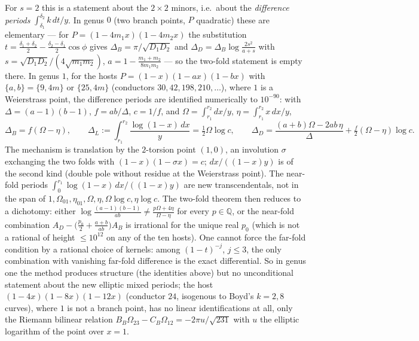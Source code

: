 \documentclass[11pt]{amsart}
\theoremstyle{remark}
\newcommand{\Q}{\mathbb Q}\newcommand{\Z}{\mathbb Z}\newcommand{\R}{\mathbb R}\newcommand{\C}{\mathbb C}
\begin{document}
For $s=2$ this is a statement about the $2\times2$ minors, i.e.\ about the \emph{difference periods} $\int_{\delta_1}^{\delta_2}k\,dt/y$. In genus $0$ (two branch points, $P$ quadratic) these are elementary — for $P=(1-4m_1x)(1-4m_2x)$ the substitution $t=\frac{\delta_1+\delta_2}2-\frac{\delta_2-\delta_1}2\cos\phi$ gives $\Delta_B=\pi/\sqrt{D_1D_2}$ and $\Delta_D=\Delta_B\log\frac{2s^2}{a+s}$ with $s=\sqrt{D_1D_2}/(4\sqrt{m_1m_2})$, $a=1-\frac{m_1+m_2}{8m_1m_2}$ — so the two-fold statement is empty there. In genus $1$, for the hosts $P=(1-x)(1-ax)(1-bx)$ with $\{a,b\}=\{9,4m\}$ or $\{25,4m\}$ (conductors $30,42,198,210,\dots$), where $1$ is a Weierstrass point, the difference periods are identified numerically to $10^{-90}$: with $\Delta=(a-1)(b-1)$, $f=ab/\Delta$, $c=1/f$, and $\Omega=\int_{r_1}^{r_2}dx/y$, $\eta=\int_{r_1}^{r_2}x\,dx/y$,
\[
\Delta_B=f(\Omega-\eta),\qquad \Delta_L:=\int_{r_1}^{r_2}\frac{\log(1-x)\,dx}y=\tfrac12\Omega\log c,\qquad \Delta_D=\frac{(a+b)\Omega-2ab\,\eta}\Delta+\tfrac f2(\Omega-\eta)\log c .
\]
The mechanism is translation by the $2$-torsion point $(1,0)$, an involution $\sigma$ exchanging the two folds with $(1-x)(1-\sigma x)=c$; $dx/((1-x)y)$ is of the second kind (double pole without residue at the Weierstrass point). The near-fold periods $\int_0^{r_1}\log(1-x)\,dx/((1-x)y)$ are new transcendentals, not in the span of $1,\Omega_{01},\eta_{01},\Omega,\eta,\Omega\log c,\eta\log c$. The two-fold theorem then reduces to a dichotomy: either $\log\frac{(a-1)(b-1)}{ab}\ne\frac{p\Omega+4\eta}{\Omega-\eta}$ for every $p\in\Q$, or the near-fold combination $A_D-\bigl(\frac{p_0}2+\frac{a+b}{ab}\bigr)A_B$ is irrational for the unique real $p_0$ (which is not a rational of height $\le10^{12}$ on any of the ten hosts). One cannot force the far-fold condition by a rational choice of kernels: among $(1-t)^{-j}$, $j\le3$, the only combination with vanishing far-fold difference is the exact differential. So in genus one the method produces structure (the identities above) but no unconditional statement about the new elliptic mixed periods; the host $(1-4x)(1-8x)(1-12x)$ (conductor $24$, isogenous to Boyd's $k=2,8$ curves), where $1$ is not a branch point, has no linear identifications at all, only the Riemann bilinear relation $B_B\Omega_{23}-C_B\Omega_{12}=-2\pi u/\sqrt{231}$ with $u$ the elliptic logarithm of the point over $x=1$.
\end{document}
